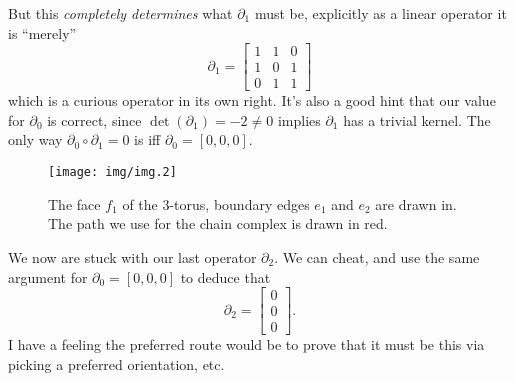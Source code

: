 But this \emph{completely determines} what $\partial_{1}$ must
be, explicitly as a linear operator it is ``merely''
\begin{equation}%
\partial_{1} = \begin{bmatrix}1 & 1 & 0\\
1 & 0 & 1\\
0 & 1 & 1\end{bmatrix}
\end{equation}
which is a curious operator in its own right. It's also a good
hint that our value for $\partial_{0}$ is correct, since
$\det(\partial_{1})=-2\neq0$ implies $\partial_{1}$ has a trivial
kernel. The only way $\partial_{0}\circ\partial_{1}=0$ is iff
$\partial_{0}=[0,0,0]$.

\begin{figure}[t]
\texttt{[image: img/img.2]}
\caption{The face $f_{1}$ of the 3-torus, boundary edges $e_{1}$
  and $e_{2}$ are drawn in. The path we use for the chain complex
  is drawn in red.}\label{fig:img2}
\end{figure}

We now are stuck with our last operator $\partial_{2}$. We can
cheat, and use the same argument for $\partial_{0}=[0,0,0]$
to deduce that
\begin{equation}%
\partial_{2} = \begin{bmatrix}0\\0\\0\end{bmatrix}.
\end{equation}
I have a feeling the preferred route would be to prove that it
must be this via picking a preferred orientation, etc.
